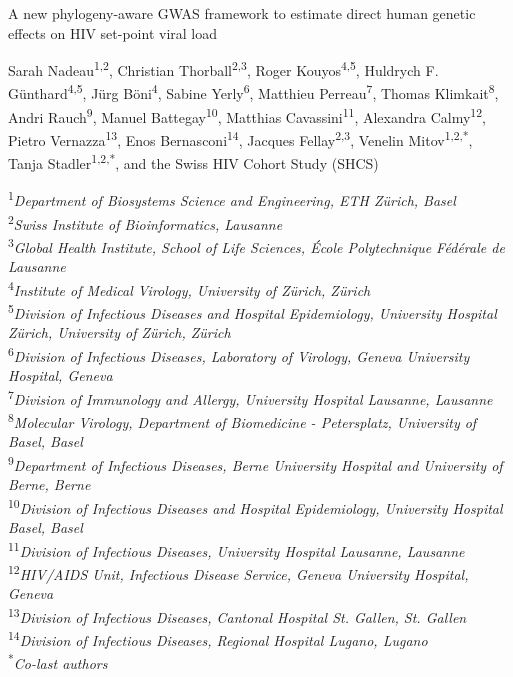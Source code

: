 \documentclass[]{article}
\begin{document}
\begin{center}
	\Large{A new phylogeny-aware GWAS framework to estimate direct human genetic effects on HIV set-point viral load}
\end{center}
\vspace{4pt}

\begin{flushleft}
	Sarah Nadeau\textsuperscript{1,2}, Christian Thorball\textsuperscript{2,3}, Roger Kouyos\textsuperscript{4,5}, Huldrych F. Günthard\textsuperscript{4,5}, Jürg Böni\textsuperscript{4}, Sabine Yerly\textsuperscript{6}, Matthieu Perreau\textsuperscript{7}, Thomas Klimkait\textsuperscript{8}, Andri Rauch\textsuperscript{9}, Manuel Battegay\textsuperscript{10}, Matthias Cavassini\textsuperscript{11}, Alexandra Calmy\textsuperscript{12}, Pietro Vernazza\textsuperscript{13}, Enos Bernasconi\textsuperscript{14}, Jacques Fellay\textsuperscript{2,3}, Venelin Mitov\textsuperscript{1,2,*}, Tanja Stadler\textsuperscript{1,2,*}, and the Swiss HIV Cohort Study (SHCS)
\end{flushleft}

\noindent
\textsuperscript{1}\emph{Department of Biosystems Science and Engineering, ETH Zürich, Basel} \\
\textsuperscript{2}\emph{Swiss Institute of Bioinformatics, Lausanne} \\
\textsuperscript{3}\emph{Global Health Institute, School of Life Sciences, École Polytechnique Fédérale de Lausanne} \\
\textsuperscript{4}\emph{Institute of Medical Virology, University of Zürich, Zürich} \\
\textsuperscript{5}\emph{Division of Infectious Diseases and Hospital Epidemiology, University Hospital Zürich, University of Zürich, Zürich} \\
\textsuperscript{6}\emph{Division of Infectious Diseases, Laboratory of Virology, Geneva University Hospital, Geneva} \\
\textsuperscript{7}\emph{Division of Immunology and Allergy, University Hospital Lausanne, Lausanne} \\
\textsuperscript{8}\emph{Molecular Virology, Department of Biomedicine - Petersplatz, University of Basel, Basel} \\
\textsuperscript{9}\emph{Department of Infectious Diseases, Berne University Hospital and University of Berne, Berne} \\
\textsuperscript{10}\emph{Division of Infectious Diseases and Hospital Epidemiology, University Hospital Basel, Basel} \\
\textsuperscript{11}\emph{Division of Infectious Diseases, University Hospital Lausanne, Lausanne} \\
\textsuperscript{12}\emph{HIV/AIDS Unit, Infectious Disease Service, Geneva University Hospital, Geneva} \\
\textsuperscript{13}\emph{Division of Infectious Diseases, Cantonal Hospital St. Gallen, St. Gallen} \\
\textsuperscript{14}\emph{Division of Infectious Diseases, Regional Hospital Lugano, Lugano} \\
\textsuperscript{*}\emph{Co-last authors}
\end{document}
